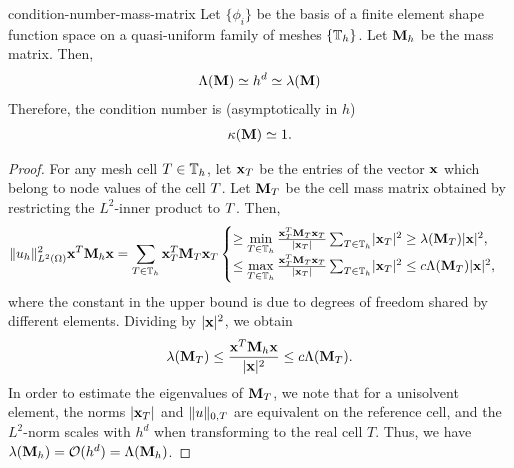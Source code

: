 \begin{Lemma}{condition-number-mass-matrix}
  Let $\{\phi_i\}$ be the basis of a finite element shape function
  space on a quasi-uniform family of meshes $\{\mathbb T_h\}$. Let
  $\mathbf M_h$ be the mass matrix. Then,
  \begin{gather*}
    \Lambda(\mathbf M) \simeq h^{d} \simeq  \lambda(\mathbf M)
  \end{gather*}
  Therefore, the condition number is (asymptotically in $h$)
  \begin{gather*}
    \kappa(\mathbf M) \simeq 1.
  \end{gather*}
\end{Lemma}

\begin{proof}
  For any mesh cell
  $T\in\mathbb T_h$, let $\mathbf x_T$ be the entries of the vector $\mathbf x$ which
  belong to node values of the cell $T$. Let $\mathbf M_T$ be the cell
  mass matrix obtained by restricting the $L^2$-inner product to
  $T$. Then,
  \begin{gather*}
    \lVert u_h\rVert_{L^2(\Omega)}^2 \mathbf x^T \mathbf M_h \mathbf x
    = \sum_{T\in\mathbb T_h} \mathbf x^T_T \mathbf M_T \mathbf x_T
    \begin{cases}
    \ge \min\limits_{T\in\mathbb T_h} \frac{\mathbf x^T_T \mathbf M_T \mathbf x_T}{\lvert\mathbf x_T\rvert} \sum_{T\in\mathbb T_h} \lvert\mathbf x_T\rvert^2 \ge \lambda(\mathbf M_T) \lvert\mathbf x\rvert^2,\\
    \le \max\limits_{T\in\mathbb T_h} \frac{\mathbf x^T_T \mathbf M_T \mathbf x_T}{\lvert\mathbf x_T\rvert} \sum_{T\in\mathbb T_h} \lvert\mathbf x_T\rvert^2 \le c \Lambda(\mathbf M_T) \lvert\mathbf x\rvert^2,
    \end{cases}
  \end{gather*}
  where the constant in the upper bound is due to degrees of freedom
  shared by different elements. Dividing by $\lvert\mathbf x\rvert^2$, we
  obtain
  \begin{gather}
    \lambda(\mathbf M_T) \le \frac{\mathbf x^T \mathbf M_h \mathbf x}{\lvert\mathbf x\rvert^2} \le c \Lambda(\mathbf M_T).
  \end{gather}
  In order to estimate the eigenvalues of $\mathbf M_T$, we note that for
  a unisolvent element, the norms $\lvert\mathbf x_T\rvert$ and $\lVert u\rVert_{0,T}$ are
  equivalent on the reference cell, and the $L^2$-norm scales with
  $h^d$ when transforming to the real cell $T$. Thus, we have
  $\lambda(\mathbf M_h) = \mathcal O(h^{d}) = \Lambda(\mathbf M_h)$.
\end{proof}


